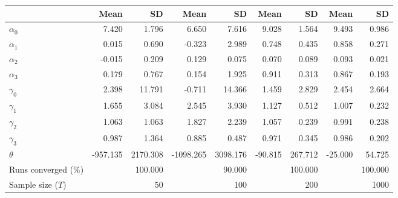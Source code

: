 
\begin{tabular}[t]{lrrrrrrrr}
\toprule
  & Mean & SD & Mean  & SD  & Mean   & SD   & Mean    & SD   \\
\midrule
$\alpha_{0}$ & 7.420 & 1.796 & 6.650 & 7.616 & 9.028 & 1.564 & 9.493 & 0.986\\
$\alpha_{1}$ & 0.015 & 0.690 & -0.323 & 2.989 & 0.748 & 0.435 & 0.858 & 0.271\\
$\alpha_{2}$ & -0.015 & 0.209 & 0.129 & 0.075 & 0.070 & 0.089 & 0.093 & 0.021\\
$\alpha_{3}$ & 0.179 & 0.767 & 0.154 & 1.925 & 0.911 & 0.313 & 0.867 & 0.193\\
$\gamma_{0}$ & 2.398 & 11.791 & -0.711 & 14.366 & 1.459 & 2.829 & 2.454 & 2.664\\
$\gamma_{1}$ & 1.655 & 3.084 & 2.545 & 3.930 & 1.127 & 0.512 & 1.007 & 0.232\\
$\gamma_{2}$ & 1.063 & 1.063 & 1.827 & 2.239 & 1.057 & 0.239 & 0.991 & 0.238\\
$\gamma_{3}$ & 0.987 & 1.364 & 0.885 & 0.487 & 0.971 & 0.345 & 0.986 & 0.202\\
$\theta$ & -957.135 & 2170.308 & -1098.265 & 3098.176 & -90.815 & 267.712 & -25.000 & 54.725\\
Runs converged (\%) &  & 100.000 &  & 90.000 &  & 100.000 &  & 100.000\\
Sample size ($T$) &  & 50 &  & 100 &  & 200 &  & 1000\\
\bottomrule
\end{tabular}
